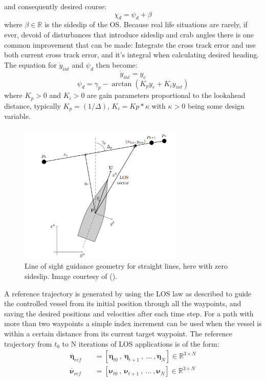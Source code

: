 and consequently desired course:
\begin{equation}
    \chi_d = \psi_d + \beta
\end{equation}
where $\beta \in \mathbb{R}$ is the sideslip of the \gls{OS}. Because real life situations are rarely, if ever, devoid of disturbances that introduce
sideslip and crab angles there is one common improvement that can be made: Integrate the cross track error and use both current cross track error, 
and it's integral when calculating desired heading. The equation for $\dot{y}_{int}$ and $\psi_d$ then become:
\begin{equation}
    \dot{y}_{int} = y_e
\end{equation}
\begin{equation}
    \psi_d = \gamma_p - \arctan(K_{p}y_e + K_{i} y_{int})
\end{equation}
where $K_{p} > 0$ and $K_{i} > 0$ are gain parameters proportional to the lookahead distance, typically $K_p = (1/\varDelta)$, $K_i = Kp*\kappa$
with $\kappa > 0$ being some design variable.

\begin{figure}
    \centering
    \includegraphics[width = 0.7\textwidth]{Images/LOS_decomp.png}
    \caption{Line of sight guidance geometry for straight lines, here with zero sideslip. Image courtesy of (\cite{lekkas2013line}).} %
    \label{FIG: LOS_decomp}
\end{figure}

A reference trajectory is generated by using the LOS law as described to guide the controlled vessel from its initial position through all the waypoints, and
saving the desired positions and velocities after each time step. For a path with more than two waypoints a simple index increment can be used when the
vessel is within a certain distance from its current target waypoint. The reference trajectory from $t_0$ to N
iterations of \gls{LOS} applications is of the form:
\begin{subequations}
    \begin{align}
        \overline{\bm{\eta}}_{ref} \quad & = [\bm{\eta}_{t0} \ , \ \bm{\eta}_{t+1} \ , \ \dots \ , \bm{\eta}_N] \in \mathbb{R}^{3 \times N} \\ 
        \overline{\bm{\nu}}_{ref} \quad & = [\bm{\nu}_{t0} \ , \ \bm{\nu}_{t+1} \ , \ \dots \ , \bm{\nu}_N] \in \mathbb{R}^{3 \times N}
    \end{align}
\end{subequations}

